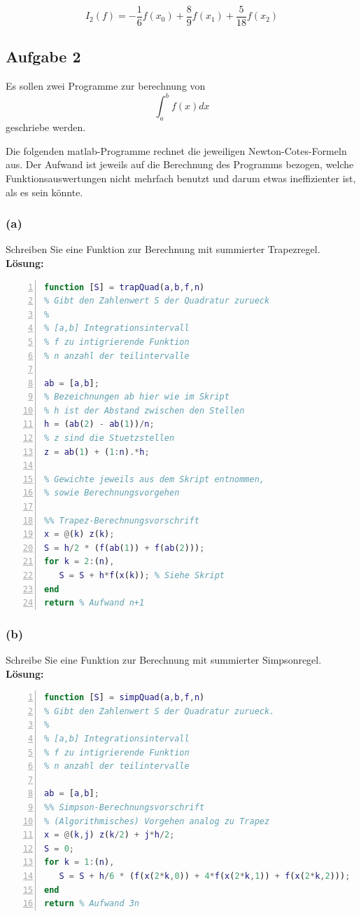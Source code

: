 \documentclass[11pt,a4paper,ngerman]{article}
\begin{document}
\begin{equation*}
I_2(f) = -\frac{1}{6} f(x_0) + \frac{8}{9} f(x_1) + \frac{5}{18} f(x_2)
\end{equation*}
\subsection*{Aufgabe 2}
Es sollen zwei Programme zur berechnung von
$$
    \int_a^b f(x) dx
$$
geschriebe werden.

Die folgenden matlab-Programme rechnet die jeweiligen Newton-Cotes-Formeln aus. Der Aufwand ist jeweils auf die Berechnung des Programms bezogen, welche Funktionsauswertungen nicht mehrfach benutzt und darum etwas ineffizienter ist, als es sein könnte.

\subsubsection*{(a)}
Schreiben Sie eine Funktion zur Berechnung mit summierter Trapezregel.\\

\textbf{Lösung:}\\
\begin{lstlisting}[language=matlab,numbers=left,caption=Quadratur nach Trapez-Regel]
function [S] = trapQuad(a,b,f,n)
% Gibt den Zahlenwert S der Quadratur zurueck
%
% [a,b] Integrationsintervall
% f zu intigrierende Funktion
% n anzahl der teilintervalle

ab = [a,b];
% Bezeichnungen ab hier wie im Skript
% h ist der Abstand zwischen den Stellen
h = (ab(2) - ab(1))/n;
% z sind die Stuetzstellen
z = ab(1) + (1:n).*h;

% Gewichte jeweils aus dem Skript entnommen,
% sowie Berechnungsvorgehen

%% Trapez-Berechnungsvorschrift
x = @(k) z(k);
S = h/2 * (f(ab(1)) + f(ab(2)));
for k = 2:(n),
   S = S + h*f(x(k)); % Siehe Skript
end
return % Aufwand n+1
\end{lstlisting}

\subsubsection*{(b)}
Schreibe Sie eine Funktion zur Berechnung mit summierter Simpsonregel.\\

\textbf{Lösung:}\\
\begin{lstlisting}[language=matlab,numbers=left,caption=Quadratur nach Simpson-Regel]
function [S] = simpQuad(a,b,f,n)
% Gibt den Zahlenwert S der Quadratur zurueck.
%
% [a,b] Integrationsintervall
% f zu intigrierende Funktion
% n anzahl der teilintervalle

ab = [a,b];
%% Simpson-Berechnungsvorschrift
% (Algorithmisches) Vorgehen analog zu Trapez
x = @(k,j) z(k/2) + j*h/2;
S = 0;
for k = 1:(n),
   S = S + h/6 * (f(x(2*k,0)) + 4*f(x(2*k,1)) + f(x(2*k,2)));
end
return % Aufwand 3n
\end{lstlisting}
\end{document}

